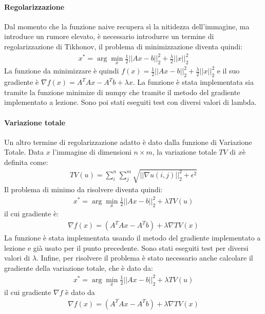 \documentclass[12pt]{article}
\begin{document}
    \paragraph{Regolarizzazione}
    Dal momento che la funzione naive recupera sì la nitidezza dell'immagine, ma introduce un rumore elevato, è necessario introdurre un termine di regolarizzazione di Tikhonov, il problema di minimizzazione diventa quindi:
    \begin{align*}
        x^* = \arg\min_x \frac{1}{2} ||Ax - b||_2^2 + \frac{\lambda}{2} ||x||_2^2
    \end{align*}
    La funzione da minimizzare è quindi $f(x) = \frac{1}{2} ||Ax - b||_2^2 + \frac{\lambda}{2} ||x||_2^2$ e il suo gradiente è $\nabla f(x) = A^TAx - A^Tb + \lambda x$.
    La funzione è stata implementata sia tramite la funzione minimize di numpy che tramite il metodo del gradiente implementato a lezione. Sono poi stati eseguiti test con diversi valori di lambda.
    
    \paragraph{Variazione totale}
    Un altro termine di regolarizzazione adatto è dato dalla funzione di Variazione Totale. Data $x$ l'immagine di dimensioni $n\times m$, la variazione totale $TV$ di $x$è definita come:
    \begin{align*}
        TV(u) = \sum_i^n{\sum_j^m{\sqrt{||\nabla u(i, j)||_2^2 + \epsilon^2}}}
    \end{align*}
    Il problema di minimo da risolvere diventa quindi:
    \begin{align*}
        x^* = \arg\min_x \frac{1}{2} ||Ax - b||_2^2 + \lambda TV(u)
    \end{align*}
    il cui gradiente è:
    \begin{align*}
    \nabla f(x) = (A^TAx - A^Tb)  + \lambda \nabla TV(x)
    \end{align*}
    La funzione è stata implementata usando il metodo del gradiente implementato a lezione e già usato per il punto precedente. Sono stati eseguiti test per diversi valori di $\lambda$.
    Infine, per risolvere il problema è stato necessario anche calcolare il gradiente della variazione totale, che è dato da:
    \begin{align*}
        x^* = \arg\min_x \frac{1}{2} ||Ax - b||_2^2 + \lambda TV(u)
    \end{align*}
    il cui gradiente $\nabla f$ è dato da
    \begin{align*}
        \nabla f(x) = (A^TAx - A^Tb)  + \lambda \nabla TV(x)
    \end{align*}
    
\end{document}
